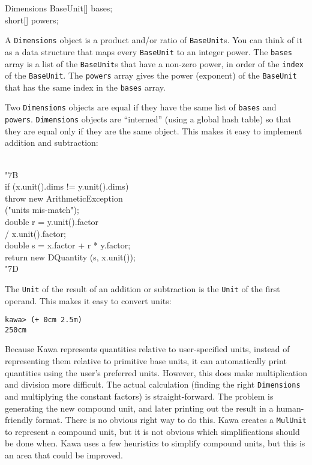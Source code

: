 \documentclass[twocolumn]{article}
\newcommand{\LBr}{\char"7B}
\newcommand{\RBr}{\char"7D}
\newcommand{\Tab}{\>}
\begin{document}
\begin{Class}{Dimensions}{}
BaseUnit[] bases;\\
short[] powers;\\
\end{Class}

A {\tt Dimensions} object is a product and/or ratio of {\tt BaseUnit}s.
You can think of it as a data structure that maps every {\tt BaseUnit}
to an integer power.  The {\tt bases} array is a list of the {\tt BaseUnit}s
that have a non-zero power, in order of the {\tt index} of the {\tt BaseUnit}.
The {\tt powers} array gives the power (exponent) of the {\tt BaseUnit}
that has the same index in the {\tt bases} array.

Two {\tt Dimensions} objects are equal if they have the same list of
{\tt bases} and {\tt powers}.  {\tt Dimensions} objects are ``interned''
(using a global hash table) so that they are equal only if they are
the same object.  This makes it easy to implement addition and
subtraction:

\begin{Code}
\\
\LBr\+\\
  if (x.unit().dims != y.unit().dims)\\
  \Tab throw new ArithmeticException\\
  \Tab\Tab ("units mis-match");\\
  double r = y.unit().factor\\
  \Tab / x.unit().factor;\\
  double s = x.factor + r * y.factor;\\
  return new DQuantity (s, x.unit());\-\\
\RBr\\
\end{Code}

The {\tt Unit} of the result of an addition or subtraction
is the {\tt Unit} of the first operand.  This makes it easy to convert units:
\begin{verbatim}
kawa> (+ 0cm 2.5m)
250cm
\end{verbatim}

Because Kawa represents quantities relative to user-specified units,
instead of representing them relative to primitive base units,
it can automatically print quantities using the user's preferred units.
However, this does make multiplication and division more difficult.
The actual calculation (finding the right {\tt Dimensions} and
multiplying the constant factors) is straight-forward.
The problem is generating the new compound unit, and
later printing out the result in a human-friendly format.
There is no obvious right way to do this.  Kawa creates
a {\tt MulUnit} to represent a compound unit, but it is not
obvious which simplifications should be done when.
Kawa uses a few heuristics to simplify compound
units, but this is an area that could be improved.
\end{document}
